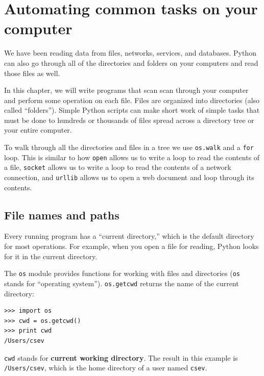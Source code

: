 \documentclass[11pt]{book}
\begin{document}
\chapter{Automating common tasks on your computer}

We have been reading data from files, networks, services,
and databases.   Python can also go through all of the 
directories and folders on your computers and read those files
as well.

In this chapter, we will write programs that scan 
scan through your computer and 
perform some operation on each file.  
Files are organized into directories (also called ``folders'').
Simple Python scripts
can make short work of simple tasks that must be done to 
hundreds or thousands of files
spread across a directory tree or your entire computer.

To walk through all the directories and files in a tree we use 
{\tt os.walk} and a {\tt for} loop.  This is similar to how 
{\tt open} allows us to write a loop to read the contents of a file,
{\tt socket} allows us to write a loop to read the contents of a network connection, and
{\tt urllib} allows us to open a web document and loop through its contents.

\section{File names and paths}
\label{paths}


Every running program has a ``current directory,'' which is the
default directory for most operations.  
For example, when you open a file for reading, Python looks for it in the
current directory.


The {\tt os} module provides functions for working with files and
directories ({\tt os} stands for ``operating system'').  {\tt os.getcwd}
returns the name of the current directory:


\beforeverb
\begin{verbatim}
>>> import os
>>> cwd = os.getcwd()
>>> print cwd
/Users/csev
\end{verbatim}
\afterverb
%
{\tt cwd} stands for {\bf current working directory}.  The result in
this example is {\tt /Users/csev}, which is the home directory of a
user named {\tt csev}.
\end{document}
